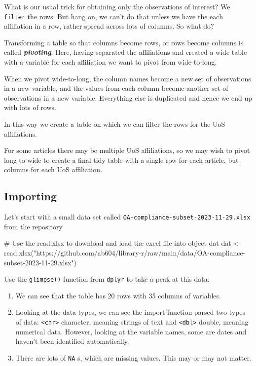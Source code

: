 \documentclass[
  letterpaper,
  DIV=11,
  numbers=noendperiod]{scrreprt}
\newenvironment{Shaded}{\begin{snugshade}}{\end{snugshade}}
\newcommand{\CommentTok}[1]{\textcolor[rgb]{0.37,0.37,0.37}{#1}}
\newcommand{\FunctionTok}[1]{\textcolor[rgb]{0.28,0.35,0.67}{#1}}
\newcommand{\NormalTok}[1]{\textcolor[rgb]{0.00,0.23,0.31}{#1}}
\newcommand{\OtherTok}[1]{\textcolor[rgb]{0.00,0.23,0.31}{#1}}
\newcommand{\StringTok}[1]{\textcolor[rgb]{0.13,0.47,0.30}{#1}}
\providecommand{\tightlist}{%
  \setlength{\itemsep}{0pt}\setlength{\parskip}{0pt}}\usepackage{longtable,booktabs,array}
\begin{document}
What is our usual trick for obtaining only the observations of interest?
We \texttt{filter} the rows. But hang on, we can't do that unless we
have the each affiliation in a row, rather spread across lots of
columns. So what do?

Transforming a table so that columns become rows, or rows become columns
is called \textbf{\emph{pivoting}}. Here, having separated the
affiliations and created a wide table with a variable for each
affiliation we want to pivot from wide-to-long.

When we pivot wide-to-long, the column names become a new set of
observations in a new variable, and the values from each column become
another set of observations in a new variable. Everything else is
duplicated and hence we end up with lots of rows.

In this way we create a table on which we can filter the rows for the
UoS affiliations.

For some articles there may be multiple UoS affiliations, so we may wish
to pivot long-to-wide to create a final tidy table with a single row for
each article, but columns for each UoS affiliation.

\hypertarget{importing}{%
\subsection{Importing}\label{importing}}

Let's start with a small data set called
\texttt{OA-compliance-subset-2023-11-29.xlsx} from the repository

\begin{Shaded}
\begin{Highlighting}[]
\CommentTok{\# Use the read.xlsx to download and load the excel file into object dat}
\NormalTok{dat }\OtherTok{\textless{}{-}} \FunctionTok{read.xlsx}\NormalTok{(}\StringTok{"https://github.com/ab604/library{-}r/raw/main/data/OA{-}compliance{-}subset{-}2023{-}11{-}29.xlsx"}\NormalTok{)}
\end{Highlighting}
\end{Shaded}

Use the \texttt{glimpse()} function from \texttt{dplyr} to take a peak
at this data:

\begin{enumerate}
\def\labelenumi{\arabic{enumi}.}
\tightlist
\item
  We can see that the table has 20 rows with 35 columns of variables.
\item
  Looking at the data types, we can see the import function parsed two
  types of data: \texttt{\textless{}chr\textgreater{}} character,
  meaning strings of text and \texttt{\textless{}dbl\textgreater{}}
  double, meaning numerical data. However, looking at the variable
  names, some are dates and haven't been identified automatically.
\item
  There are lots of \texttt{NA} s, which are missing values. This may or
  may not matter.
\end{enumerate}
\end{document}
